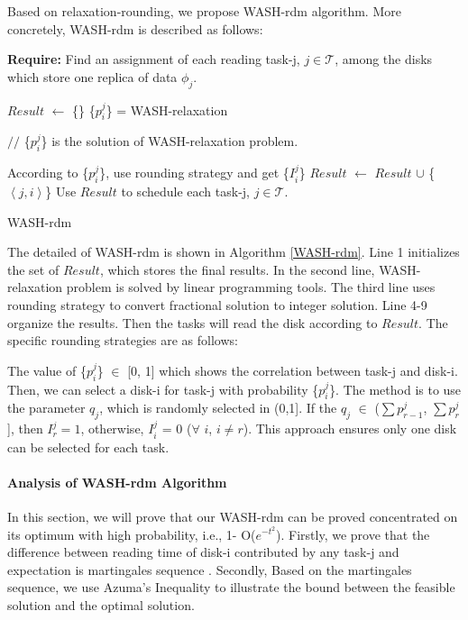 \documentclass[conference]{IEEEtran}
\begin{document}
 Based on relaxation-rounding, we propose WASH-rdm algorithm. More concretely, WASH-rdm is described as follows: 

  \begin{algorithm}
 	\textbf{Require:} Find an assignment of each reading task-j, $j \in \mathcal{T}$, among the disks which store one replica of data $\phi_j$. %
 	\begin{algorithmic}[1]	
 		\State $Result$ $\gets$ \{\}
 		\State \{$p_i^j$\} = WASH-relaxation		
 		
 		$//$ \{$p_i^j$\} is the solution of WASH-relaxation problem. 
 		
 		\State According to \{$p_i^j$\}, use rounding strategy and get \{$I_i^j$\}
 			\State $Result$ $\gets$ $Result$ $\cup$ 	
 			\{$\left \langle j, i\right \rangle$\}
 			\EndIf
 		\EndFor	
 		\State Use $Result$ to schedule each task-j, $j \in \mathcal{T}$.
 	\end{algorithmic}
 	\caption{WASH-rdm}\label{WASH-rdm}
 \end{algorithm}

 The detailed of WASH-rdm is shown in Algorithm \ref{WASH-rdm}. Line 1 initializes the set of $Result$, which stores the final results. In the second line, WASH-relaxation problem is solved by linear programming tools. The third line uses rounding strategy to convert fractional solution to integer solution. Line 4-9 organize the results. Then the tasks will read the disk according to $Result$. The specific rounding strategies are as follows:
 
 The value of \{$p_i^j$\}  $\in$ [0, 1] which shows the correlation between task-j and disk-i. Then, we can select a disk-i for task-j with probability \{$p_i^j$\}. The method is to use the parameter $q_j$, which is randomly selected in (0,1]. If the $q_j$ $\in$ ($\sum p_{r-1}^{j}$, $\sum p_{r}^{j}$], then $I_r^j = 1$, otherwise, $I_i^j$ = 0 ($\forall$ $i$, $i \ne r$). This approach ensures only one disk can be selected for each task.%


\paragraph{\textbf{Analysis of WASH-rdm Algorithm}}

In this section, we will prove that our WASH-rdm can be proved concentrated on its optimum with high probability, i.e., 1- O($e^{-t^2}$). Firstly, we prove that the difference between reading time of disk-i contributed by any task-j and expectation is martingales sequence \cite{b12}. Secondly, Based on the martingales sequence, we use Azuma's Inequality to illustrate the bound between the feasible solution and the optimal solution.
\end{document}
